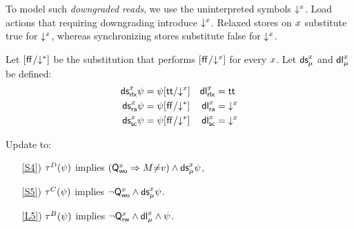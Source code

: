 To model such \emph{downgraded reads}, we use the uninterpreted symbols
$\Dx{\aLoc}$.  Load actions that requiring downgrading introduce $\Dx{\aLoc}$.
Relaxed stores on $\aLoc$ substitute true for $\Dx{\aLoc}$, whereas
synchronizing stores substitute false for $\Dx{\aLoc}$.

\begin{definition}
  \label{def:DS}
  Let $[\FALSE/\D]$ be the substitution that performs $[\FALSE/\Dx{\aLoc}]$
  for every $\aLoc$.
  Let $\DS{\aLoc}{\amode}$ and $\DL{\aLoc}{\amode}$ be defined:
  \begin{align*}
    \DS{\aLoc}{\mRLX}{\bForm}&=\bForm[\TRUE/\Dx{\aLoc}] 
    &\DL{\aLoc}{\mRLX}&=\TRUE
    \\
    \DS{\aLoc}{\mRA}{\bForm}&=\bForm[\FALSE/\D]
    &\DL{\aLoc}{\mRA}&=\Dx{\aLoc}
    \\
    \DS{\aLoc}{\mSC}{\bForm}&=\bForm[\FALSE/\D]
    &\DL{\aLoc}{\mSC}&=\Dx{\aLoc}
  \end{align*}
\end{definition}

\begin{definition}[$\xCO$/$\xRASC$/$\xDGR$]
  \label{def:pomsets-down}
  Update  to:
  \begin{enumerate}
  \item[\ref{S4})]
    $\aTr{\bEvs}{\bForm}$ implies $(\Qw{\aLoc}\limplies\aExp{\neq}\aVal)\land \DS{\aLoc}{\amode}\bForm\noSUB{[\aExp/\aLoc]}$,
  \item[\ref{S5})]
    $\aTr{\cEvs}{\bForm}$ implies $\lnot\Qw{\aLoc}\land \DS{\aLoc}{\amode}\bForm\noSUB{[\aExp/\aLoc]}$.
  \item[\ref{L5})]
    $\aTr{\dEvs}{\bForm}$ implies $\lnot\Qx{\aLoc} \land \DL{\aLoc}{\amode} \land\bForm$.
  \end{enumerate}
\end{definition}

